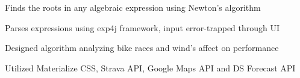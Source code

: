 \documentclass[]{deedy-resume-openfont}
\begin{document}
\begin{minipage}[t]{0.66\textwidth}


\begin{tightemize}
\item Finds the roots in any algebraic expression using Newton's algorithm\\ %
\item Parses expressions using exp4j framework, input error-trapped through UI\\
\end{tightemize}
\sectionsep

\begin{tightemize}
\item Designed algorithm analyzing bike races and wind's affect on performance \\
\item Utilized Materialize CSS, Strava API, Google Maps API and DS Forecast API\\
\end{tightemize}
\sectionsep




\end{minipage}
\end{document}
